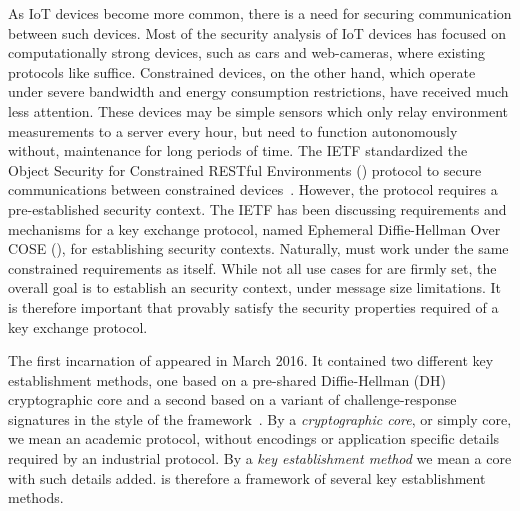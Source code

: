\documentclass[runningheads, envcountsame, hidelinks, a4paper, draft, x11names]{llncs}
\begin{document}
As IoT devices become more common, there is a need for securing communication
between such devices.
%
Most of the security analysis of IoT devices has focused on computationally
strong devices, such as cars and web-cameras, where existing protocols like
\mDandTls{} suffice.
%
Constrained devices, on the other hand, which operate under severe
bandwidth and energy consumption restrictions, have received much less
attention.
%
These devices may be simple sensors which only relay environment
measurements to a server every hour, but need to function autonomously without,
maintenance for long periods of time.
%
%
%
%
The IETF standardized the Object Security for
Constrained RESTful Environments (\mOscore{}) protocol to secure communications
between constrained devices~\cite{rfc8613}.
%
However, the \mOscore{} protocol requires a pre-established security context.
%
The IETF has been discussing requirements and mechanisms for a key
exchange protocol, named Ephemeral Diffie-Hellman Over COSE (\mEdhoc), for
establishing \mOscore{} security contexts.
%
Naturally, \mEdhoc{} must work under the same constrained requirements as
\mOscore{} itself.
%
While not all use cases for \mEdhoc{} are firmly set, the overall goal is to
establish an \mOscore{} security context, under message size limitations.
%
It is therefore important that \mEdhoc{} provably satisfy the security
properties required of a key exchange protocol.
%

%
The first incarnation of \mEdhoc{} appeared in March 2016.
%
It contained two different key establishment methods, one based on a
pre-shared Diffie-Hellman (DH) cryptographic core and a second based on a
variant of challenge-response signatures in the style of the \mNoise{}
framework~\cite{perrin2016noise}.
%
By a \emph{cryptographic core}, or simply core, we mean an academic protocol,
without encodings or application specific details required by an industrial
protocol.
%
By a \emph{key establishment method} we mean a core with such details added.
%
\mEdhoc{} is therefore a framework of several key establishment methods.
%
\end{document}

